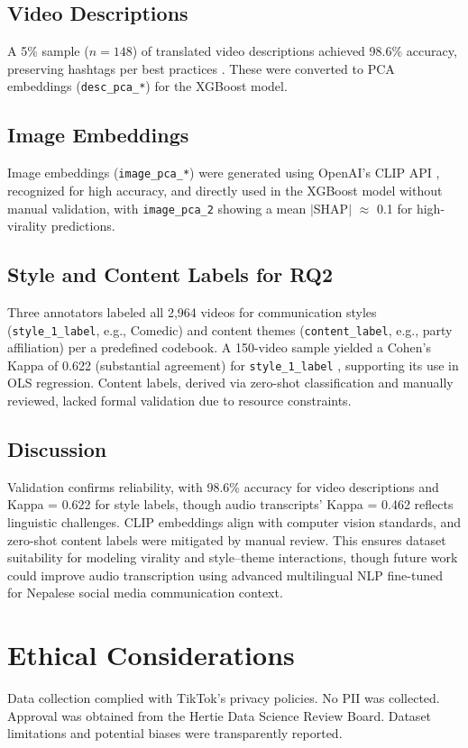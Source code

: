 \documentclass[12pt,a4paper]{report}
\begin{document}
\subsection{Video Descriptions}
A 5\% sample (\(n=148\)) of translated video descriptions achieved 98.6\% accuracy, preserving hashtags per best practices \parencite{highfield2016instagrammatics}. These were converted to PCA embeddings (\texttt{desc\_pca\_*}) for the XGBoost model.

\subsection{Image Embeddings}
Image embeddings (\texttt{image\_pca\_*}) were generated using OpenAI’s CLIP API \parencite{radford2021learning}, recognized for high accuracy, and directly used in the XGBoost model without manual validation, with \texttt{image\_pca\_2} showing a mean $|$SHAP$|$ $\approx$ 0.1 for high-virality predictions.

\subsection{Style and Content Labels for RQ2}
Three annotators labeled all 2,964 videos for communication styles (\texttt{style\_1\_label}, e.g., Comedic) and content themes (\texttt{content\_label}, e.g., party affiliation) per a predefined codebook. A 150-video sample yielded a Cohen’s Kappa of 0.622 (substantial agreement) for \texttt{style\_1\_label} \parencite{landis1977measurement}, supporting its use in OLS regression. Content labels, derived via zero-shot classification and manually reviewed, lacked formal validation due to resource constraints.

\subsection{Discussion}
Validation confirms reliability, with 98.6\% accuracy for video descriptions and Kappa = 0.622 for style labels, though audio transcripts’ Kappa = 0.462 reflects linguistic challenges. CLIP embeddings align with computer vision standards, and zero-shot content labels were mitigated by manual review. This ensures dataset suitability for modeling virality and style–theme interactions, though future work could improve audio transcription using advanced multilingual NLP fine-tuned for Nepalese social media communication context.

\section{Ethical Considerations}
Data collection complied with TikTok’s privacy policies. No PII was collected. Approval was obtained from the Hertie Data Science Review Board. Dataset limitations and potential biases were transparently reported.
\end{document}
